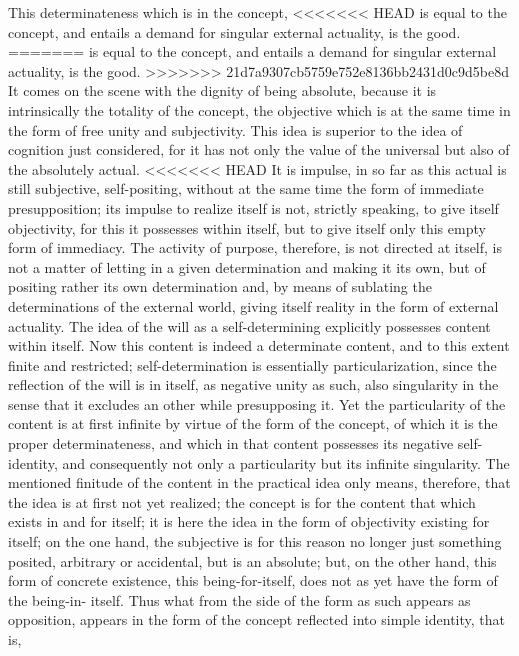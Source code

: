 This determinateness which is in the concept,
<<<<<<< HEAD
is equal to the concept,
and entails a demand for singular external actuality, is the good.
=======
is equal to the concept, and entails a demand for
singular external actuality, is the good.
>>>>>>> 21d7a9307cb5759e752e8136bb2431d0c9d5be8d
It comes on the scene with the dignity of being absolute,
because it is intrinsically the totality of the concept,
the objective which is at the same time
in the form of free unity and subjectivity.
This idea is superior to the idea of cognition just considered,
for it has not only the value of the universal
but also of the absolutely actual.
<<<<<<< HEAD
It is impulse, in so far as this actual is still
subjective, self-positing, without at the same time the form of immediate
presupposition; its impulse to realize itself is not, strictly speaking, to give
itself objectivity, for this it possesses within itself, but to give itself only
this empty form of immediacy.
The activity of purpose, therefore, is
not directed at itself, is not a matter of letting in a given determination
and making it its own, but of positing rather its own determination and,
by means of sublating the determinations of the external world, giving
itself reality in the form of external actuality.
The idea of the will as a
self-determining explicitly possesses content within itself. Now this content
is indeed a determinate content, and to this extent finite and restricted;
self-determination is essentially particularization, since the reflection of
the will is in itself, as negative unity as such, also singularity in the sense
that it excludes an other while presupposing it. Yet the particularity of the
content is at first infinite by virtue of the form of the concept, of which
it is the proper determinateness, and which in that content possesses its
negative self-identity, and consequently not only a particularity but its
infinite singularity. The mentioned finitude of the content in the practical
idea only means, therefore, that the idea is at first not yet realized; the
concept is for the content that which exists in and for itself; it is here the
idea in the form of objectivity existing for itself; on the one hand, the
subjective is for this reason no longer just something posited, arbitrary or
accidental, but is an absolute; but, on the other hand, this form of concrete
existence, this being-for-itself, does not as yet have the form of the being-in-
itself. Thus what from the side of the form as such appears as opposition,
appears in the form of the concept reflected into simple identity, that is,
